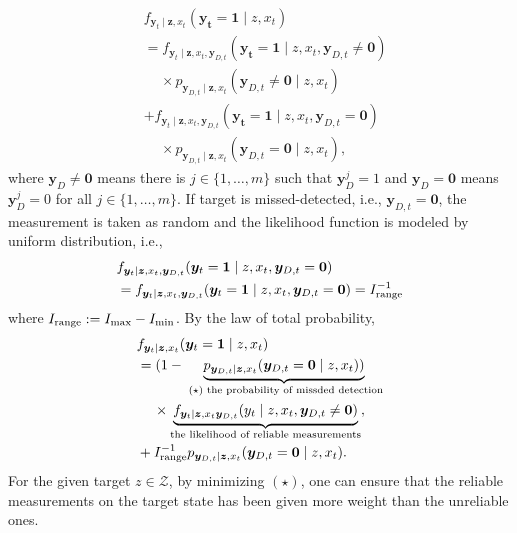 \documentclass[letterpaper, 10 pt, conference]{ieeeconf}
\begin{document}
\begin{align*}
&f_{\bm{y}_t \mid \bm{z},x_{t}}(\bm{y_t}=\bm{1} \mid z,x_{t}) \\
&=f_{\bm{y}_t \mid \bm{z},x_{t},\bm{y}_{D,t}}(\bm{y_t}=\bm{1} \mid z,x_{t},\bm{y}_{D,t} \neq \mathbf{0}) \\ 
&\,\,\,\,\,\,\,\times p_{\bm{y}_{D,t} \mid \bm{z},x_{t}}(\bm{y}_{D,t} \neq \mathbf{0} \mid z,x_{t}) \nonumber\\
&+f_{\bm{y}_t \mid \bm{z},x_{t},\bm{y}_{D,t}}(\bm{y_t}=\bm{1} \mid z,x_{t},\bm{y}_{D,t}=\mathbf{0}) \\
&\,\,\,\,\,\,\,\times p_{\bm{y}_{D,t} \mid \bm{z},x_{t}}(\bm{y}_{D,t} =\mathbf{0} \mid z,x_{t}), \nonumber
\end{align*}
where $\bm{y}_D \neq \mathbf{0}$ means there is $j \in \lbrace 1,\dots,m \rbrace$ such that $\bm{y}_D^j = 1$ and $\bm{y}_D = \mathbf{0}$ means $\bm{y}_D^j = 0$ for all $j \in \lbrace 1,\dots,m \rbrace$. 
If target is missed-detected, i.e., $\bm{y}_{D,t} =\bm{0}$, the measurement is taken as random and the likelihood function is modeled by uniform distribution, i.e.,
\begin{align*}
&f_{\bm{y}_t \mid \bm{z},x_{t},\bm{y}_{D,t}}(\bm{y}_t = \bm{1} \mid z,x_{t},\bm{y}_{D,t}=\mathbf{0}) \\
&=f_{\bm{y}_t \mid \bm{z},x_{t},\bm{y}_{D,t}}(\bm{y}_t = \bm{1} \mid z,x_{t},\bm{y}_{D,t}=\mathbf{0})= I_{\textup{range}}^{-1}
\end{align*}
where $I_{\textup{range}} := I_{\max} - I_{\min}$. By the law of total probability,
\begin{align}
&f_{\bm{y}_t \mid \bm{z},x_{t}}(\bm{y}_t = \bm{1} \mid z,x_{t}) \nonumber \\
&=(1-
\underbrace{
p_{\bm{y}_{D,t} \mid \bm{z},x_{t}}(\bm{y}_{D,t} = \mathbf{0} \mid z,x_{t}))}_{\textup{ }(\star) \textup{ the probability of missded detection}} \nonumber \\ 
&\,\,\,\,\,\,\,\times \underbrace{f_{\bm{y}_t \mid \bm{z},x_{t}\bm{y}_{D,t}}(y_t \mid z,x_{t},\bm{y}_{D,t}\neq \mathbf{0})}_{\textup{the likelihood of reliable measurements}}, \nonumber \\
&+I_{\textup{range}}^{-1}p_{\bm{y}_{D,t} \mid \bm{z},x_{t}}(\bm{y}_{D,t} = \mathbf{0} \mid z,x_{t}).
\label{eq10}
\end{align}
For the given target $z \in \mathcal{Z}$, by minimizing $(\star)$, one can ensure that the reliable measurements on the target state has been given more weight than the unreliable ones. 
\end{document}
